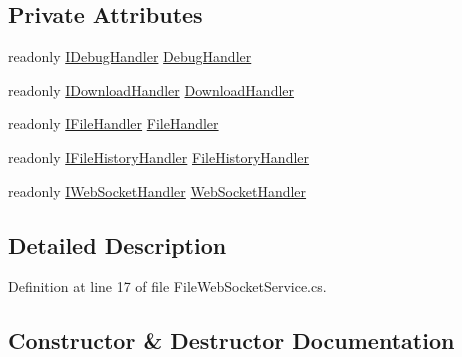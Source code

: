 \subsection*{Private Attributes}
\begin{DoxyCompactItemize}
\item 
readonly \mbox{\hyperlink{interface_little_weeb_library_1_1_handlers_1_1_i_debug_handler}{I\+Debug\+Handler}} \mbox{\hyperlink{class_little_weeb_library_1_1_services_1_1_file_web_socket_service_a972c8d4e2c4c18fc0692b374a5dc0755}{Debug\+Handler}}
\item 
readonly \mbox{\hyperlink{interface_little_weeb_library_1_1_handlers_1_1_i_download_handler}{I\+Download\+Handler}} \mbox{\hyperlink{class_little_weeb_library_1_1_services_1_1_file_web_socket_service_a1454bdaf3155b52f7323760d365a4ba5}{Download\+Handler}}
\item 
readonly \mbox{\hyperlink{interface_little_weeb_library_1_1_handlers_1_1_i_file_handler}{I\+File\+Handler}} \mbox{\hyperlink{class_little_weeb_library_1_1_services_1_1_file_web_socket_service_a8ce883130927cd3c38f2cf82c09f5521}{File\+Handler}}
\item 
readonly \mbox{\hyperlink{interface_little_weeb_library_1_1_handlers_1_1_i_file_history_handler}{I\+File\+History\+Handler}} \mbox{\hyperlink{class_little_weeb_library_1_1_services_1_1_file_web_socket_service_aa3e7ce6b984037bf7ff11df859b83361}{File\+History\+Handler}}
\item 
readonly \mbox{\hyperlink{interface_little_weeb_library_1_1_handlers_1_1_i_web_socket_handler}{I\+Web\+Socket\+Handler}} \mbox{\hyperlink{class_little_weeb_library_1_1_services_1_1_file_web_socket_service_a6217e3b7706763f8cc5215a352140402}{Web\+Socket\+Handler}}
\end{DoxyCompactItemize}


\subsection{Detailed Description}


Definition at line 17 of file File\+Web\+Socket\+Service.\+cs.



\subsection{Constructor \& Destructor Documentation}
\mbox{\label{class_little_weeb_library_1_1_services_1_1_file_web_socket_service_a06fb16d6cce4fdc44878a384ad85efc4}} 
